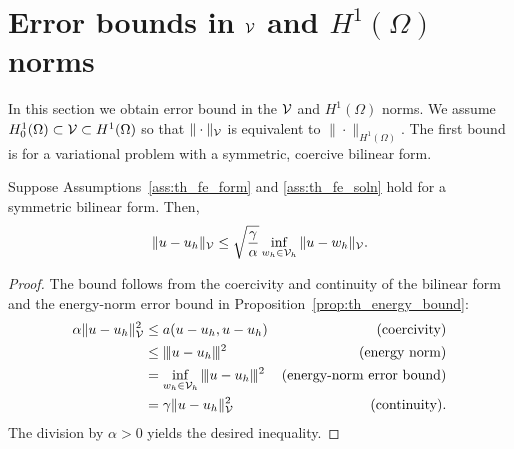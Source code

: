 \section{Error bounds in $\mathcal{V}$ and $H^1(\Omega)$ norms}
In this section we obtain error bound in the $\mathcal{V}$ and $H^1(\Omega)$ norms.  We assume $H^1_0(\Omega) \subset \mathcal{V} \subset H^1(\Omega)$ so that $\| \cdot \|_{\mathcal{V}}$ is equivalent to $\| \cdot \|_{H^1(\Omega)}$.  The first bound is for a variational problem with a symmetric, coercive bilinear form.
\begin{lemma}
  \label{lemma:th_cea_sym}
   Suppose Assumptions~\ref{ass:th_fe_form} and \ref{ass:th_fe_soln} hold for a symmetric bilinear form. Then, 
  \begin{equation}
    \| u - u_h \|_{\mathcal{V}} \leq \sqrt{\frac{\gamma}{\alpha}} \inf_{w_h \in \mathcal{V}_h} \| u - w_h \|_{\mathcal{V}}.
    \label{eq:th_cea_sym}
  \end{equation}
  \begin{proof}
    The bound follows from the coercivity and continuity of the bilinear form and the energy-norm error bound in Proposition~\eqref{prop:th_energy_bound}:
    \begin{align*}
      \alpha \| u - u_h \|^2_{\mathcal{V}}
      &\leq a(u - u_h, u - u_h) & \text{(coercivity)} \\
      &\leq |\kern-1pt|\kern-1pt|  u - u_h  |\kern-1pt|\kern-1pt|^2 & \text{(energy norm)} \\
      & = \inf_{w_h \in \mathcal{V}_h} |\kern-1pt|\kern-1pt|  u - u_h  |\kern-1pt|\kern-1pt|^2 & \text{(energy-norm error bound)} \\
      & = \gamma \| u - u_h \|^2_{\mathcal{V}} & \text{(continuity)}.
    \end{align*}
    The division by $\alpha > 0$ yields the desired inequality.
  \end{proof}
\end{lemma}

